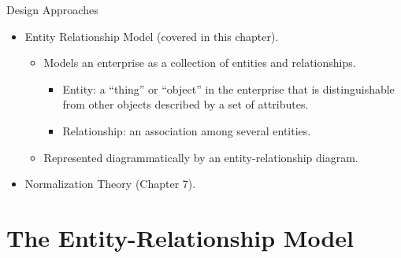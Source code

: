 \documentclass[aspectratio=169]{beamer}
\begin{document}
\begin{frame}{Design Approaches}
    \begin{itemize}
        \item Entity Relationship Model (covered in this chapter).
        \begin{itemize}
            \item Models an enterprise as a collection of entities and relationships.
            \begin{itemize}
                \item Entity: a ``thing'' or ``object'' in the enterprise that is distinguishable from other objects described by a set of attributes.
                \item Relationship: an association among several entities.
            \end{itemize}
            \item Represented diagrammatically by an entity-relationship diagram.
        \end{itemize}
        \item Normalization Theory (Chapter 7).
    \end{itemize}
\end{frame}

\section{The Entity-Relationship Model}
\end{document}
